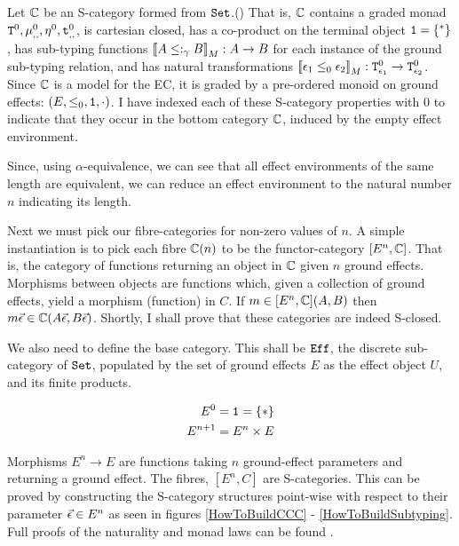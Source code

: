 \documentclass{Report}
\begin{document}
Let $\mathbb{C}$ be an S-category formed from $\texttt{Set}$.() That is, $\mathbb{C}$ contains a graded monad $\texttt{T}^0_{}, \mu_{, , }^0, \eta_{}^0, \texttt{t}_{, , }^0$, is cartesian closed, has a co-product on the terminal object $\texttt{1} = \left\{^*\right\}$, has sub-typing functions ${\bf [\![}A\leq:_\gamma B{\bf ]\!]}_M: A \rightarrow B$ for each instance of the ground sub-typing relation, and has natural transformations ${\bf [\![}\epsilon_1 \leq_0 \epsilon_2{\bf ]\!]}_M: \texttt{T}^0_{\epsilon_1} \rightarrow \texttt{T}^0_{\epsilon_2}$. Since $\mathbb{C}$ is a model for the EC, it is graded by a pre-ordered monoid on ground effects: $(E, \leq_0, \texttt{1}, \cdot)$. I have indexed each of these S-category properties with $0$ to indicate that they occur in the bottom category $\mathbb{C}$, induced by the empty effect environment.



Since, using $\alpha$-equivalence, we can see that all effect environments of the same length are equivalent, we can reduce an effect environment to the natural number $n$ indicating its length.

Next we must pick our fibre-categories for non-zero values of $n$. A simple instantiation is to pick each fibre $\mathbb{C}(n)$ to be the functor-category $[E^n, \mathbb{C}]$. That is, the category of functions returning an object in $\mathbb{C}$ given $n$ ground effects. Morphisms between objects are functions which, given a collection of ground effects, yield a morphism (function) in $C$. If $m\in [E^n, \mathbb{C}](A, B)$ then $m\vec{\epsilon}\in\mathbb{C}(A\vec{\epsilon}, B\vec{\epsilon})$. Shortly, I shall prove that these categories are indeed S-closed.

We also need to define the base category. This shall be $\texttt{Eff}$, the discrete sub-category of $\texttt{Set}$, populated by the set of ground effects $E$ as the effect object $U$, and its finite products.

\begin{align}
    E^0 & = \texttt{1} = \left\{\ast\right\}\\
    E^{n+1} &= E^n \times E
\end{align}

Morphisms $E^n \rightarrow E$ are functions taking $n$ ground-effect parameters and returning a ground effect. The fibres, $[E^n, C]$ are S-categories. This can be proved by constructing the S-category structures point-wise with respect to their parameter $\vec{\epsilon} \in E^n$ as seen in figures \ref{HowToBuildCCC} - \ref{HowToBuildSubtyping}. Full proofs of the naturality and monad laws can be found .
\end{document}
